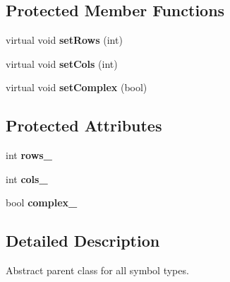 \subsection*{Protected Member Functions}
\begin{DoxyCompactItemize}
\item 
\hypertarget{class_g_e_symbol_a8f5a7ba90f2d124529d6b9d7aa59cb59}{virtual void {\bfseries set\-Rows} (int)}\label{class_g_e_symbol_a8f5a7ba90f2d124529d6b9d7aa59cb59}

\item 
\hypertarget{class_g_e_symbol_a5de6b791c1f11ef2a18e5e6335f1731e}{virtual void {\bfseries set\-Cols} (int)}\label{class_g_e_symbol_a5de6b791c1f11ef2a18e5e6335f1731e}

\item 
\hypertarget{class_g_e_symbol_abc3312d19d04a1eef62c0c4d255924df}{virtual void {\bfseries set\-Complex} (bool)}\label{class_g_e_symbol_abc3312d19d04a1eef62c0c4d255924df}

\end{DoxyCompactItemize}
\subsection*{Protected Attributes}
\begin{DoxyCompactItemize}
\item 
\hypertarget{class_g_e_symbol_a36b478c80c6b652753f2b125d2de596a}{int {\bfseries rows\-\_\-}}\label{class_g_e_symbol_a36b478c80c6b652753f2b125d2de596a}

\item 
\hypertarget{class_g_e_symbol_ad6fa1f94281aebfc239e73aaefa34866}{int {\bfseries cols\-\_\-}}\label{class_g_e_symbol_ad6fa1f94281aebfc239e73aaefa34866}

\item 
\hypertarget{class_g_e_symbol_a8ad78c322adee566f1180f9d9b359798}{bool {\bfseries complex\-\_\-}}\label{class_g_e_symbol_a8ad78c322adee566f1180f9d9b359798}

\end{DoxyCompactItemize}


\subsection{Detailed Description}
Abstract parent class for all symbol types. 

